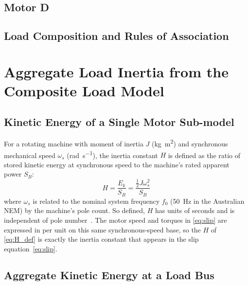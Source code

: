 \documentclass[journal]{IEEEtran}
\begin{document}
\subsection{Motor D}

\subsection{Load Composition and Rules of Association}



\section{Aggregate Load Inertia from the Composite Load Model}
\label{sec:method}
\subsection{Kinetic Energy of a Single Motor Sub-model}
For a rotating machine with moment of inertia $J$ (\si{\kilo\gram\metre\squared})
and synchronous mechanical speed $\omega_s$ (\si{\radian\per\second}), the
inertia constant $H$ is defined as the ratio of stored kinetic energy at
synchronous speed to the machine's rated apparent power $S_B$:
%
\begin{equation}
    H = \frac{E_k}{S_B} = \frac{\frac{1}{2}J\omega_s^2}{S_B}
    \label{eq:H_def}
\end{equation}
%
where $\omega_s$ is related to the nominal system frequency $f_0$
(\SI{50}{\hertz} in the Australian NEM) by the machine's pole count. So defined,
$H$ has units of seconds and is independent of pole number~\cite{Kundur1994}.
The motor speed and torques in \eqref{eq:slip} are expressed in per unit on this
same synchronous-speed base, so the $H$ of \eqref{eq:H_def} is exactly the
inertia constant that appears in the slip equation~\eqref{eq:slip}.


\subsection{Aggregate Kinetic Energy at a Load Bus}
\end{document}
